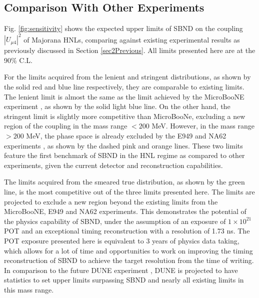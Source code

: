 \subsection{Comparison With Other Experiments}

Fig. \ref{fig:sensitivity} shows the expected upper limits of SBND on the coupling $|U_{\mu4}|^2$ of Majorana HNLs, comparing against existing experimental results as previously discussed in Section \ref{sec2Previous}.
All limits presented here are at the 90\% C.L.

For the limits acquired from the lenient and stringent distributions, as shown by the solid red and blue line respectively, they are comparable to existing limits.
The lenient limit is almost the same as the limit achieved by the MicroBooNE experiment \cite{uboone1, uboone2, uboone3}, as shown by the solid light blue line.
On the other hand, the stringent limit is slightly more competitive than MicroBooNe, excluding a new region of the coupling in the mass range $< 200$ MeV.
However, in the mass range $> 200$ MeV, the phase space is already excluded by the E949 \cite{E949} and NA62 experiments \cite{NA62A, NA62B}, as shown by the dashed pink and orange lines.
These two limits feature the first benchmark of SBND in the HNL regime as compared to other experiments, given the current detector and reconstruction capabilities.

The limits acquired from the smeared true distribution, as shown by the green line, is the most competitive out of the three limits presented here.
The limits are projected to exclude a new region beyond the existing limits from the MicroBooNE, E949 and NA62 experiments.
This demonstrates the potential of the physics capability of SBND, under the assumption of an exposure of $1 \times 10^{21}$ POT and an exceptional timing reconstruction with a resolution of 1.73 ns.
The POT exposure presented here is equivalent to 3 years of physics data taking, which allows for a lot of time and opportunities to work on improving the timing reconstruction of SBND to achieve the target resolution from the time of writing.
In comparison to the future DUNE experiment \cite{HNLSilvia}, DUNE is projected to have statistics to set upper limits surpassing SBND and nearly all existing limits in this mass range.

